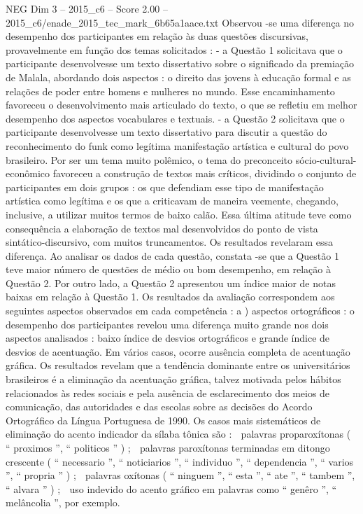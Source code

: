 \begin{textsample}{NEG Dim 3 – 2015\_c6 – Score 2.00 – 2015\_c6/enade\_2015\_tec\_mark\_6b65a1aace.txt}
Observou -se uma diferença no desempenho dos participantes em relação às duas questões discursivas, provavelmente em função dos temas solicitados : - a Questão 1 solicitava que o participante desenvolvesse um texto dissertativo sobre o significado da premiação de Malala, abordando dois aspectos : o direito das jovens à educação formal e as relações de poder entre homens e mulheres no mundo.
Esse encaminhamento favoreceu o desenvolvimento mais articulado do texto, o que se refletiu em melhor desempenho dos aspectos vocabulares e textuais. - a Questão 2 solicitava que o participante desenvolvesse um texto dissertativo para discutir a questão do reconhecimento do funk como legítima manifestação artística e cultural do povo brasileiro.
Por ser um tema muito polêmico, o tema do preconceito sócio-cultural-econômico favoreceu a construção de textos mais críticos, dividindo o conjunto de participantes em dois grupos : os que defendiam esse tipo de manifestação artística como legítima e os que a criticavam de maneira veemente, chegando, inclusive, a utilizar muitos termos de baixo calão.
Essa última atitude teve como consequência a elaboração de textos mal desenvolvidos do ponto de vista sintático-discursivo, com muitos truncamentos.
Os resultados revelaram essa diferença.
Ao analisar os dados de cada questão, constata -se que a Questão 1 teve maior número de questões de médio ou bom desempenho, em relação à Questão 2.
Por outro lado, a Questão 2 apresentou um índice maior de notas baixas em relação à Questão 1.
Os resultados da avaliação correspondem aos seguintes aspectos observados em cada competência : a ) aspectos ortográficos : o desempenho dos participantes revelou uma diferença muito grande nos dois aspectos analisados : baixo índice de desvios ortográficos e grande índice de desvios de acentuação.
Em vários casos, ocorre ausência completa de acentuação gráfica.
Os resultados revelam que a tendência dominante entre os universitários brasileiros é a eliminação da acentuação gráfica, talvez motivada pelos hábitos relacionados às redes sociais e pela ausência de esclarecimento dos meios de comunicação, das autoridades e das escolas sobre as decisões do Acordo Ortográfico da Língua Portuguesa de 1990.
Os casos mais sistemáticos de eliminação do acento indicador da sílaba tônica são :  palavras proparoxítonas ( “ proximos ”, “ politicos ” ) ;  palavras paroxítonas terminadas em ditongo crescente ( “ necessario ”, “ noticiarios ”, “ individuo ”, “ dependencia ”, “ varios ”, “ propria ” ) ;  palavras oxítonas ( “ ninguem ”, “ esta ”, “ ate ”, “ tambem ”, “ alvara ” ) ;  uso indevido do acento gráfico em palavras como “ genêro ”, “ melâncolia ”, por exemplo.

\end{textsample}
